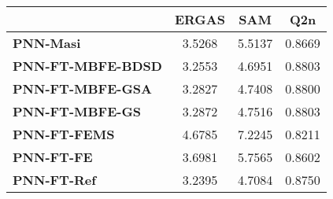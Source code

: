 \begin{tabular}{|l|c|c|c|}
\hline
&\textbf{ERGAS}&\textbf{SAM}&\textbf{Q2n}\\\hline
\textbf{PNN-Masi}&3.5268&5.5137&0.8669\\\hline
\textbf{PNN-FT-MBFE-BDSD}&3.2553&4.6951&0.8803\\\hline
\textbf{PNN-FT-MBFE-GSA}&3.2827&4.7408&0.8800\\\hline
\textbf{PNN-FT-MBFE-GS}&3.2872&4.7516&0.8803\\\hline
\textbf{PNN-FT-FEMS}&4.6785&7.2245&0.8211\\\hline
\textbf{PNN-FT-FE}&3.6981&5.7565&0.8602\\\hline
\textbf{PNN-FT-Ref}&3.2395&4.7084&0.8750\\\hline
\end{tabular}
